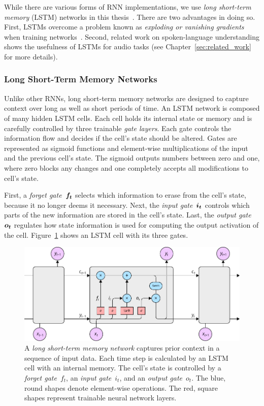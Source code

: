 	While there are various forms of RNN implementations, we use \emph{long short-term memory} (LSTM) networks in this thesis~\cite{hochreiter1997long}. There are two advantages in doing so. First, LSTMs overcome a problem known as  \emph{exploding or vanishing gradients} when training networks~\cite[p.~288]{Goodfellow-et-al-2016}. Second, related work on spoken-language understanding shows the usefulness of LSTMs for audio tasks (see Chapter~\ref{sec:related_work} for more details).

\subsubsection{Long Short-Term Memory Networks}
Unlike other RNNs, long short-term memory networks are designed to capture context over long as well as short periods of time. An LSTM network is composed of many hidden LSTM cells. Each cell holds its internal state or memory and is carefully controlled by three trainable \emph{gate layers}. Each gate controls the information flow and decides if the cell's state should be altered. Gates are represented as sigmoid functions and element-wise multiplications of the input and the previous cell's state. The sigmoid outputs numbers between zero and one, where zero blocks any changes and one completely accepts all modifications to cell's state.

First, a \emph{forget gate}~$\boldsymbol{f_t}$ selects which information to erase from the cell's state, because it no longer deems it necessary. Next, the \emph{input gate}~$\boldsymbol{i_t}$ controls which parts of the new information are stored in the cell's state. Last, the \emph{output gate}~$\boldsymbol{o_t}$ regulates how state information is used for computing the output activation of the cell. Figure~\ref{fig:lstm} shows an LSTM cell with its three gates.
%
	\begin{figure}[tp]
  		\centering
    	\includegraphics{img/lstm.pdf}
    	\caption{A \emph{long short-term memory network} captures prior context in a sequence of input data. Each time step is calculated by an LSTM cell with an internal memory. The cell's state is controlled by a \emph{forget gate}~$f_t$, an \emph{input gate}~$i_t$, and an \emph{output gate}~$o_t$. The blue, round shapes denote element-wise operations. The red, square shapes represent trainable neural network layers.}
    	\label{fig:lstm}
	\end{figure}
%

